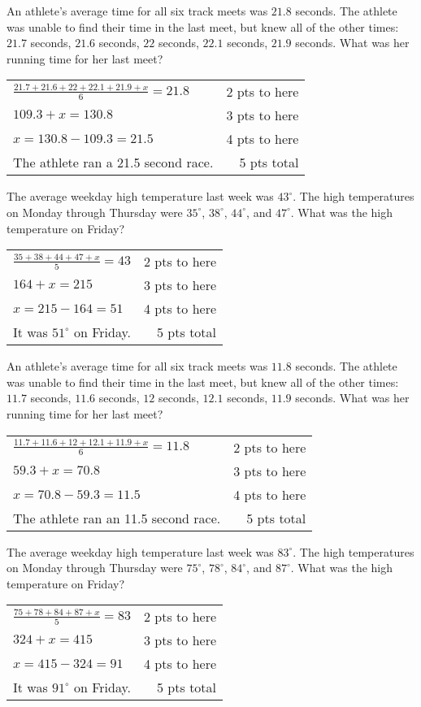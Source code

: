 {
	An athlete's average time for all six track meets was $21.8$ seconds. The athlete was unable to find their time in the last meet, but knew all of the other times: $21.7$ seconds, $21.6$ seconds, $22$ seconds, $22.1$ seconds, $21.9$ seconds. What was her running time for her last meet?
}
{
	\begin{tabular}{l r}
	$\frac{21.7+21.6+22+22.1+21.9+x}{6}=21.8$ & 2 pts to here\\
	$ 109.3 +x=130.8$ & 3 pts to here\\
	$x=130.8-109.3=21.5$ & 4 pts to here\\
	The athlete ran a 21.5 second race. & 5 pts  total\\
	\end{tabular}
}

{
	The average weekday high temperature last week was $43^{\circ}$. The high temperatures on Monday through Thursday were $35^{\circ}$, $38^{\circ}$, $44^{\circ}$, and $47^{\circ}$. What was the high temperature on Friday?
}
{
	\begin{tabular}{l r}
	$\frac{35+38+44+47+x}{5}=43$ & 2 pts to here\\
	$164 +x=215$ & 3 pts to here\\
	$x=215-164=51$ & 4 pts to here\\
	It was $51^{\circ}$ on Friday. & 5 pts total
	\end{tabular}
}

{
	An athlete's average time for all six track meets was $11.8$ seconds. The athlete was unable to find their time in the last meet, but knew all of the other times: $11.7$ seconds, $11.6$ seconds, $12$ seconds, $12.1$ seconds, $11.9$ seconds. What was her running time for her last meet?
}
{
	\begin{tabular}{l r}
	$\frac{11.7+11.6+12+12.1+11.9+x}{6}=11.8$ & 2 pts to here\\
	$ 59.3 +x=70.8$ & 3 pts to here\\
	$x=70.8-59.3=11.5$ & 4 pts to here\\
	The athlete ran an 11.5 second race. & 5 pts  total\\
	\end{tabular}
}

{
	The average weekday high temperature last week was $83^{\circ}$. The high temperatures on Monday through Thursday were $75^{\circ}$, $78^{\circ}$, $84^{\circ}$, and $87^{\circ}$. What was the high temperature on Friday?
}
{
	\begin{tabular}{l r}
	$\frac{75+78+84+87+x}{5}=83$ & 2 pts to here\\
	$324 +x=415$ & 3 pts to here\\
	$x=415-324=91$ & 4 pts to here\\
	It was $91^{\circ}$ on Friday. & 5 pts total
	\end{tabular}
}
